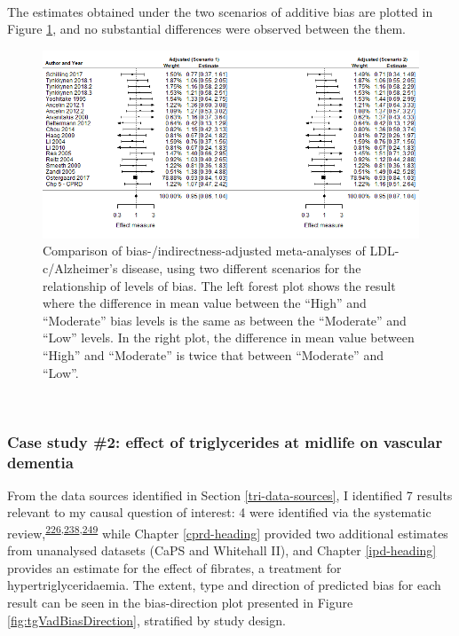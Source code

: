 \documentclass[a4paper, twoside]{templates/ociamthesis}
\begin{document}
~

The estimates obtained under the two scenarios of additive bias are plotted in Figure \ref{fig:fpLdlAdComparison}, and no substantial differences were observed between the them.





\begin{figure}[H]
\includegraphics[width=1\linewidth]{figures/tri/fp_paired_midlife_ldl_ad_scenarios} \caption[Comparison of bias-/indirectness-adjusted meta-analyses under two different scenarios of prior distributions of bias.]{Comparison of bias-/indirectness-adjusted meta-analyses of LDL-c/Alzheimer's disease, using two different scenarios for the relationship of levels of bias. The left forest plot shows the result where the difference in mean value between the ``High'' and ``Moderate'' bias levels is the same as between the ``Moderate'' and ``Low'' levels. In the right plot, the difference in mean value between ``High'' and ``Moderate'' is twice that between ``Moderate'' and ``Low''.}\label{fig:fpLdlAdComparison}
\end{figure}

~

\hypertarget{case-study-2-effect-of-triglycerides-at-midlife-on-vascular-dementia}{%
\subsubsection{Case study \#2: effect of triglycerides at midlife on vascular dementia}\label{case-study-2-effect-of-triglycerides-at-midlife-on-vascular-dementia}}

From the data sources identified in Section \ref{tri-data-sources}, I identified 7 results relevant to my causal question of interest: 4 were identified via the systematic review,\textsuperscript{\protect\hyperlink{ref-forti2010}{226},\protect\hyperlink{ref-raffaitin2009}{238},\protect\hyperlink{ref-yoshitake1995}{249}} while Chapter \ref{cprd-heading} provided two additional estimates from unanalysed datasets (CaPS and Whitehall II), and Chapter \ref{ipd-heading} provides an estimate for the effect of fibrates, a treatment for hypertriglyceridaemia. The extent, type and direction of predicted bias for each result can be seen in the bias-direction plot presented in Figure \ref{fig:tgVadBiasDirection}, stratified by study design.
\end{document}

